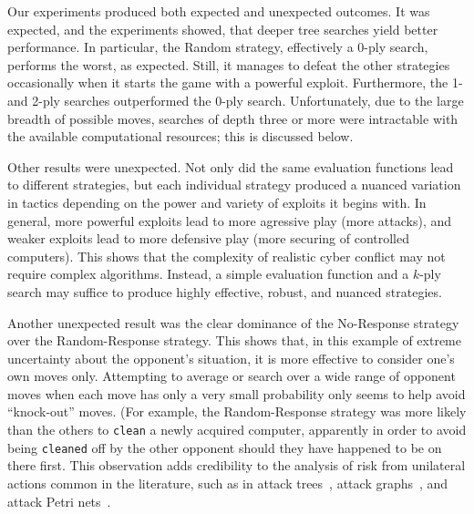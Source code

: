 Our experiments produced both expected and unexpected 
outcomes. It was expected, and the experiments showed, that deeper
tree searches yield better performance. In particular, the Random
strategy, effectively a 0-ply search, performs the worst, as
expected. Still, it manages to defeat the other strategies
occasionally when it starts the game with a powerful
exploit. Furthermore, the 1- and 2-ply searches outperformed the 0-ply
search.  Unfortunately, due to the large breadth of possible moves,
searches of depth three or more were intractable with the available
computational resources; this is discussed below.

Other results were unexpected. Not only did the same evaluation
functions lead to different strategies, but each individual strategy
produced a nuanced variation in tactics depending on the power and
variety of exploits it
begins with. 
In general, more powerful exploits lead to more agressive
play (more attacks), and weaker exploits lead to more defensive play
(more securing of controlled computers). This shows that the
complexity of realistic cyber conflict may not require
complex algorithms. Instead, a simple evaluation function and a
$k$-ply search may suffice to produce highly effective, robust, and
nuanced strategies.

Another unexpected result was the clear dominance of the No-Response
strategy over the Random-Response strategy. This shows that, in this
example of extreme uncertainty about the opponent's situation, it is
more effective to consider one's own moves only. Attempting to average
or search over a wide range of opponent moves when each move has only
a very small probability only seems to help avoid ``knock-out''
moves. (For example, the Random-Response strategy was more likely than
the others to {\tt clean} a newly acquired computer, apparently in
order to avoid being {\tt cleaned} off by the other opponent should
they have happened to be on there first. This observation adds
credibility to the analysis of risk from unilateral actions common in the
literature, such as in attack trees~\cite{schneier1999attack}, attack
graphs~\cite{sheyner2002automated}, and attack Petri
nets~\cite{zakrzewska2011modeling}.

